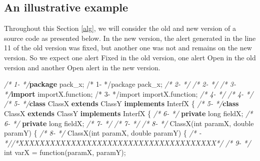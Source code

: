 \documentclass[
]{article}
\newenvironment{Shaded}{\begin{snugshade}}{\end{snugshade}}
\newcommand{\CommentTok}[1]{\textcolor[rgb]{0.56,0.35,0.01}{\textit{#1}}}
\newcommand{\DataTypeTok}[1]{\textcolor[rgb]{0.13,0.29,0.53}{#1}}
\newcommand{\FunctionTok}[1]{\textcolor[rgb]{0.00,0.00,0.00}{#1}}
\newcommand{\ImportTok}[1]{#1}
\newcommand{\KeywordTok}[1]{\textcolor[rgb]{0.13,0.29,0.53}{\textbf{#1}}}
\newcommand{\NormalTok}[1]{#1}
\begin{document}
\subsection{An illustrative example}\label{source_used}

Throughout this Section \ref{alg}, we will consider the old and new
version of a source code as presented below. In the new version, the
alert generated in the line 11 of the old version was fixed, but another
one was not and remains on the new version. So we expect one alert Fixed
in the old version, one alert Open in the old version and another Open
alert in the new version.

\scriptsize

\begin{Shaded}
\begin{Highlighting}[]
\CommentTok{/*  1-   */}\KeywordTok{package}\ImportTok{ pack_x;                                          /*  1-   */package pack_x;}                                          
\CommentTok{/*  2-   */}                                                         \CommentTok{/*  2-   */}                                                         
\CommentTok{/*  3-   */}\KeywordTok{import}\ImportTok{ importX.function;                                 /*  3-   */import importX.function;}                                 
\CommentTok{/*  4-   */}                                                         \CommentTok{/*  4-   */}                                                         
\CommentTok{/*  5-   */}\KeywordTok{class}\NormalTok{ ClassX }\KeywordTok{extends}\NormalTok{ ClassY }\KeywordTok{implements}\NormalTok{ InterfX \{         }\CommentTok{/*  5-   */}\KeywordTok{class}\NormalTok{ ClassX }\KeywordTok{extends}\NormalTok{ ClassY }\KeywordTok{implements}\NormalTok{ InterfX \{         }
\CommentTok{/*  6-   */}    \KeywordTok{private} \DataTypeTok{long}\NormalTok{ fieldX;                                 }\CommentTok{/*  6-   */}    \KeywordTok{private} \DataTypeTok{long}\NormalTok{ fieldX;                                 }
\CommentTok{/*  7-   */}                                                         \CommentTok{/*  7-   */}                                                         
\CommentTok{/*  8-   */}    \FunctionTok{ClassX}\NormalTok{(}\DataTypeTok{int}\NormalTok{ paramX, }\DataTypeTok{double}\NormalTok{ paramY) \{                  }\CommentTok{/*  8-   */}    \FunctionTok{ClassX}\NormalTok{(}\DataTypeTok{int}\NormalTok{ paramX, }\DataTypeTok{double}\NormalTok{ paramY) \{                  }
\CommentTok{/*   -   *//*XXXXXXXXXXXXXXXXXXXXXXXXXXXXXXXXXXXXXX*/}               \CommentTok{/*  9-   */}        \DataTypeTok{int}\NormalTok{ varX = }\FunctionTok{function}\NormalTok{(paramX, paramY);                  }

\end{Highlighting}
\end{Shaded}
\end{document}
